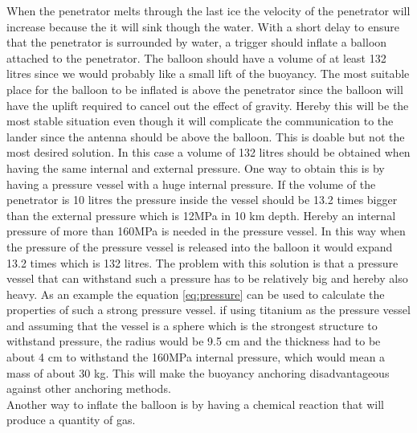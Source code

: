When the penetrator melts through the last ice the velocity of the penetrator will increase because the it will sink though the water. With a short delay to ensure that the penetrator is surrounded by water, a trigger should inflate a balloon attached to the penetrator. The balloon should have a volume of at least 132 litres since we would probably like a small lift of the buoyancy. The most suitable place for the balloon to be inflated is above the penetrator since the balloon will have the uplift required to cancel out the effect of gravity. Hereby this will be the most stable situation even though it will complicate the communication to the lander since the antenna should be above the balloon. This is doable but not the most desired solution. In this case a volume of 132 litres should be obtained when having the same internal and external pressure. One way to obtain this is by having a pressure vessel with a huge internal pressure. If the volume of the penetrator is 10 litres the pressure inside the vessel should be 13.2 times bigger than the external pressure which is 12MPa in 10 km depth. Hereby an internal pressure of more than 160MPa is needed in the pressure vessel. In this way when the pressure of the pressure vessel is released into the balloon it would expand 13.2 times which is 132 litres. The problem with this solution is that a pressure vessel that can withstand such a pressure has to be relatively big and hereby also heavy. As an example the equation \ref{eq:pressure} can be used to calculate the properties of such a strong pressure vessel.  if using titanium as the pressure vessel and assuming that the vessel is a sphere which is the strongest structure to withstand pressure, the radius would be 9.5 cm and the thickness had to be about 4 cm to withstand the 160MPa internal pressure, which would mean a mass of about 30 kg. This will make the buoyancy anchoring disadvantageous against other anchoring methods. \\

Another way to inflate the balloon is by having a chemical reaction that will produce a quantity of gas.


